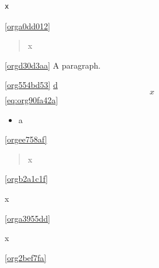 \documentclass[11pt]{article}
\author{root}
\date{\today}
\title{}
\begin{document}
\tableofcontents

\label{orga0dd012}
\begin{verbatim}
x
\end{verbatim}
\ref{orga0dd012}
\label{orgd30d3aa}
\begin{quote}
x
\end{quote}
\ref{orgd30d3aa}
A paragraph.

\ref{org554bd53} \hyperref[org554bd53]{d}
\begin{equation}
\label{eq:org90fa42a}
x
\end{equation}
\ref{eq:org90fa42a}
\label{orgee758af}
\begin{itemize}
\item a
\end{itemize}
\ref{orgee758af}
\label{orgb2a1c1f}
\begin{verse}
x\\[0pt]
\end{verse}
\ref{orgb2a1c1f}
\label{orga3955dd}
\begin{center}
x
\end{center}
\ref{orga3955dd}
\begin{foo}
x
\label{org2bef7fa}
\end{foo}
\ref{org2bef7fa}
\end{document}
